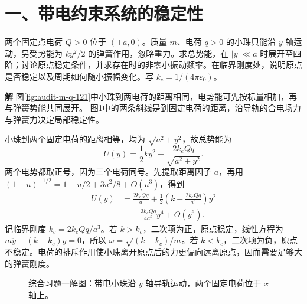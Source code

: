 \documentclass[11pt,openany,fontset=fandol]{ctexbook}
\theoremstyle{plain}\newtheorem{theorem}{定理}[chapter]\newtheorem{proposition}[theorem]{命题}
\theoremstyle{definition}\newtheorem{definition}{定义}[chapter]\newtheorem{example}{例}[chapter]
\theoremstyle{remark}\newtheorem*{remark}{说明}
\newcommand{\SolutionStart}{\par\nobreak\medskip\nobreak\noindent\textbf{解}\quad\ignorespaces}
\newenvironment{solution}{\SolutionStart}{\par\medskip}
\begin{document}
\noindent\begin{minipage}{\textwidth}
\vspace{12pt}
\section*{一、带电约束系统的稳定性}
两个固定点电荷 $Q>0$ 位于 $(\pm a,0)$。质量 $m$、电荷 $q>0$ 的小珠只能沿 $y$ 轴运动，另受势能为 $ky^2/2$ 的弹簧作用，忽略重力。求总势能，在 $|y|\ll a$ 时展开至四阶；讨论原点稳定条件，并求存在时的非零小振动频率。在临界刚度处，说明原点是否稳定以及周期如何随小振幅变化。写 $k_e=1/(4\pi\varepsilon_0)$。

\end{minipage}\par

\begin{solution}
图\ref{fig:audit-m-q-121}中小珠到两电荷的距离相同，电势能可先按标量相加，再与弹簧势能共同展开。
图\ref{fig:ex-5-1}中的两条斜线是到固定电荷的距离，沿导轨的合电场力与弹簧力决定局部稳定性。

小珠到两个固定电荷的距离相等，均为 $\sqrt{a^2+y^2}$，故总势能为
\[
U(y)=\frac12ky^2+\frac{2k_eQq}{\sqrt{a^2+y^2}}.
\]
两个电势都取正号，因为三个电荷同号。先提取距离因子 $a$，再用 $(1+u)^{-1/2}=1-u/2+3u^2/8+O(u^3)$，得到
\begin{align*}
U(y)&=\frac{2k_eQq}{a}
+\frac12\left(k-\frac{2k_eQq}{a^3}\right)y^2\\
&\quad+\frac{3k_eQq}{4a^5}y^4+O(y^6).
\end{align*}
记临界刚度 $k_c=2k_eQq/a^3$。若 $k>k_c$，二次项为正，原点稳定，线性方程为 $m\ddot y+(k-k_c)y=0$，所以 $\omega=\sqrt{(k-k_c)/m}$。若 $k<k_c$，二次项为负，原点不稳定。电荷的排斥作用使小珠离开原点后的力更偏向远离原点，因而需要足够大的弹簧刚度。

\begin{figure}[H]\centering
{}
\caption{综合习题一解图：带电小珠沿 $y$ 轴导轨运动，两个固定电荷位于 $x$ 轴上。}\label{fig:ex-5-1}
\end{figure}


\end{solution}
\end{document}
